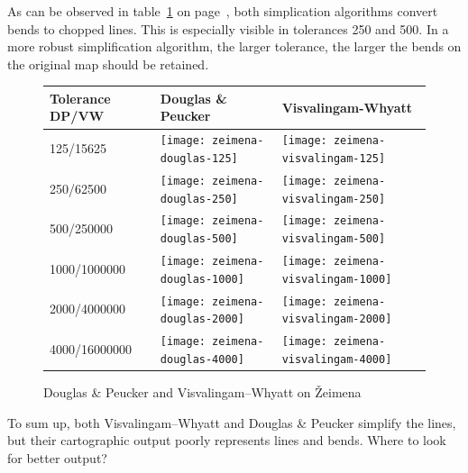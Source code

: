 \documentclass[a4paper]{article}
\newcommand{\DP}{Douglas \& Peucker}
\newcommand{\VW}{Visvalingam--Whyatt}
\begin{document}
As can be observed in table~\ref{tab:comparison-zeimena} on
page~\pageref{tab:comparison-zeimena}, both simplication algorithms convert
bends to chopped lines. This is especially visible in tolerances 250 and 500.
In a more robust simplification algorithm, the larger tolerance, the larger the
bends on the original map should be retained.

\begin{figure}[H]
    \renewcommand{\tabularxcolumn}[1]{>{\center\small}m{#1}}
    \begin{tabularx}{\textwidth}{ p{2.1cm} | X | X | }
        Tolerance DP/VW                                                   &
        Douglas \& Peucker                                                &
        Visvalingam-Whyatt                                                \tabularnewline \hline

        125/15625                                                         &
        \texttt{[image: zeimena-douglas-125]}           &
        \texttt{[image: zeimena-visvalingam-125]}       \tabularnewline \hline

        250/62500                                                         &
        \texttt{[image: zeimena-douglas-250]}         &
        \texttt{[image: zeimena-visvalingam-250]}     \tabularnewline \hline

        500/250000                                                        &
        \texttt{[image: zeimena-douglas-500]}        &
        \texttt{[image: zeimena-visvalingam-500]}    \tabularnewline \hline

        1000/1000000                                                      &
        \texttt{[image: zeimena-douglas-1000]}      &
        \texttt{[image: zeimena-visvalingam-1000]}  \tabularnewline \hline

        2000/4000000                                                      &
        \texttt{[image: zeimena-douglas-2000]}     &
        \texttt{[image: zeimena-visvalingam-2000]} \tabularnewline \hline

        4000/16000000                                                     &
        \texttt{[image: zeimena-douglas-4000]}     &
        \texttt{[image: zeimena-visvalingam-4000]} \tabularnewline \hline
    \end{tabularx}
    \caption{{\DP} and {\VW} on Žeimena}
    \label{tab:comparison-zeimena}
\end{figure}


To sum up, both {\VW} and {\DP} simplify the lines, but their cartographic
output poorly represents lines and bends. Where to look for better output?
\end{document}
